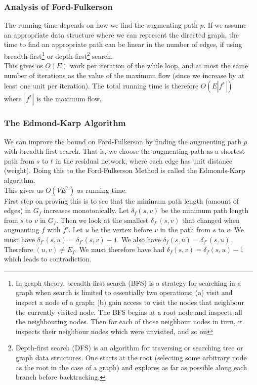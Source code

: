 \documentclass[12pt]{article}
\begin{document}
\subsubsection{Analysis of Ford-Fulkerson}
The running time depends on how we find the augmenting path $p$. If we assume an appropriate data structure where we can represent the directed graph, the time to find an appropriate path can be linear in the number of edges, if using breadth-first\footnote{In graph theory, breadth-first search (BFS) is a strategy for searching in a graph when search is limited to essentially two operations: (a) visit and inspect a node of a graph; (b) gain access to visit the nodes that neighbour the currently visited node. The BFS begins at a root node and inspects all the neighbouring nodes. Then for each of those neighbour nodes in turn, it inspects their neighbour nodes which were unvisited, and so on} or depth-first\footnote{Depth-first search (DFS) is an algorithm for traversing or searching tree or graph data structures. One starts at the root (selecting some arbitrary node as the root in the case of a graph) and explores as far as possible along each branch before backtracking.} search. \\

This gives os $O(E)$ work per iteration of the while loop, and at most the same number of iterations as the value of the maximum flow (since we increase by at least one unit per iteration). The total running time is therefore $O(E |f^*|)$ where $|f^*|$ is the maximum flow. 
%
\subsubsection{The Edmond-Karp Algorithm}
We can improve the bound on Ford-Fulkerson by finding the augmenting path $p$ with breadth-first search. That is, we choose the augmenting path as a shortest path from $s$ to $t$ in the residual network, where each edge has unit distance (weight). Doing this to the Ford-Fulkerson Method is called the Edmonds-Karp algorithm. \\

This gives us $O(VE^2)$ as running time. \\

First step on proving this is to see that the minimum path length (amount of edges) in $G_f$ increases monotonically. Let $\delta_f(s, v)$ be the minimum path length from $s$ to $v$ in $G_f$. Then we look at the smallest $\delta_{f'}(s, v)$ that changed when augmenting $f$ with $f'$. Let $u$ be the vertex before $v$ in the path from $s$ to $v$. We must have $\delta_{f'}(s, u) = \delta_{f'}(s, v) - 1$. We also have $\delta_f(s, u) = \delta_{f'}(s, u)$. Therefore $(u, v) \neq E_f$. We must therefore have had $\delta_f(s, v) = \delta_f(s, u) - 1$ which leads to contradiction. \\
\end{document}
